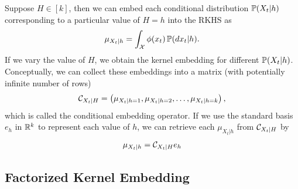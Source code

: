 \documentclass{article}
\begin{document}
Suppose $H\in[k]$, then we can embed each conditional distribution $\mathbb{P}(X_t|h)$ corresponding to a particular value of $H=h$ into the RKHS as
\begin{align}
  \mu_{X_t|h} = \int_{\mathcal{X}} \phi(x_t)\, \mathbb{P}(dx_t | h).
\end{align}
If we vary the value of $H$, we  obtain the kernel embedding for different $\mathbb{P}(X_t|h)$. Conceptually, we can collect these embeddings into a matrix (with potentially infinite number of rows)
\begin{align}
  \mathcal{C}_{X_t|H} = \left(\mu_{X_t|h=1},\mu_{X_t|h=2},\ldots,\mu_{X_t|h=k}\right),
\end{align}
which is called the conditional embedding operator. If we use the standard basis $e_h$ in $\mathbb{R}^k$ to represent each value of $h$, we can retrieve each $\mu_{X_t|h}$ from $\mathcal{C}_{X_t|H}$ by
\begin{align}
  \mu_{X_t|h} = \mathcal{C}_{X_t|H} e_h
\end{align}

\subsection{Factorized Kernel Embedding}
\end{document}
